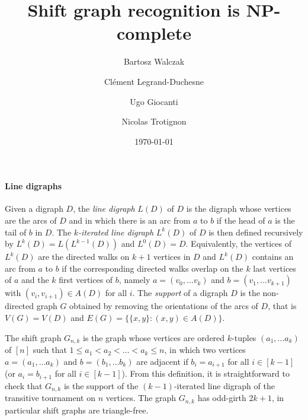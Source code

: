 \documentclass[11pt,a4aper]{article}
\title{Shift graph recognition is NP-complete}
\date{\today}
\author{
Bartosz Walczak\footnotemark[1] \and 
Cl\'ement Legrand-Duchesne\footnotemark[1]\and
Ugo Giocanti\footnotemark[1] \and
Nicolas Trotignon\footnotemark[2]
}
\renewcommand{\le}{\leqslant}
\begin{document}
\maketitle

\renewcommand{\thefootnote}{\fnsymbol{footnote}} %

\footnotetext[2]{}

\renewcommand{\thefootnote}{\arabic{footnote}} %

\begin{abstract}
\end{abstract}


\paragraph{Line digraphs}
Given a digraph $D$, the \emph{line digraph} $L(D)$ of $D$ is the digraph whose
vertices are the arcs of $D$ and in which there is an arc from $a$ to $b$ if the
head of $a$ is the tail of $b$ in $D$. The \emph{$k$-iterated line digraph} $L^k(D)$
of $D$ is then defined recursively by $L^k(D) = L(L^{k-1}(D))$ and $L^0(D) = D$.
Equivalently, the vertices of $L^k(D)$ are the directed walks on $k+1$ vertices
in $D$ and $L^k(D)$ contains an arc from $a$ to $b$ if the corresponding
directed walks overlap on the $k$ last vertices of $a$ and the $k$ first vertices
of $b$, namely $a = (v_0, \dots v_k)$ and $b=(v_1, \dots v_{k+1})$ with
$(v_i,v_{i+1}) \in A(D)$ for all $i$. The \emph{support} of a digraph $D$ is the
non-directed graph $G$ obtained by removing the orientations of the arcs of $D$,
that is $V(G) = V(D)$ and $E(G) = \{\{x,y\} \colon (x,y) \in A(D)\}$. 

The shift graph $G_{n,k}$ is the graph whose vertices are ordered $k$-tuples
$(a_1, \dots a_k)$ of $[n]$ such that $1 \le a_1 < a_2 < \dots < a_k \le n$, in
which two vertices $a = (a_1, \dots a_k)$ and $b = (b_1, \dots b_k)$ are
adjacent if $b_i = a_{i+1}$ for all $i \in [k-1]$ (or $a_i = b_{i+1}$ for all
$i \in [k-1]$). From this definition, it is straightforward to check that
$G_{n,k}$ is the support of the $(k-1)$-iterated line digraph of the transitive
tournament on $n$ vertices. The graph $G_{n,k}$ has odd-girth $2k+1$, in
particular shift graphs are triangle-free.
\end{document}
